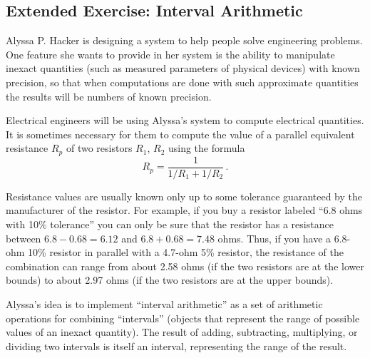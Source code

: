 \subsection{Extended Exercise: Interval Arithmetic}
\label{Section 2.1.4}

Alyssa P. Hacker is designing a system to help people solve engineering problems.
One feature she wants to provide in her system is the ability to manipulate inexact quantities (such as measured parameters of physical devices) with known precision, so that when computations are done with such approximate quantities the results will be numbers of known precision.

Electrical engineers will be using Alyssa’s system to compute electrical quantities.
It is sometimes necessary for them to compute the value of a parallel equivalent resistance \( R_p \) of two resistors \( R_1 \), \( R_2 \) using the formula
\[
	R_p = \frac{1}{1 / R_1 + 1 / R_2} \,.
\]

Resistance values are usually known only up to some tolerance guaranteed by the manufacturer of the resistor.
For example, if you buy a resistor labeled “6.8 ohms with 10\% tolerance” you can only be sure that the resistor has a resistance between \( 6.8 - 0.68 = 6.12 \) and \( 6.8 + 0.68 = 7.48 \) ohms.
Thus, if you have a 6.8-ohm 10\% resistor in parallel with a 4.7-ohm 5\% resistor, the resistance of the combination can range from about 2.58 ohms (if the two resistors are at the lower bounds) to about 2.97 ohms (if the two resistors are at the upper bounds).

Alyssa’s idea is to implement “interval arithmetic” as a set of arithmetic operations for combining “intervals” (objects that represent the range of possible values of an inexact quantity).
The result of adding, subtracting, multiplying, or dividing two intervals is itself an interval, representing the range of the result.

